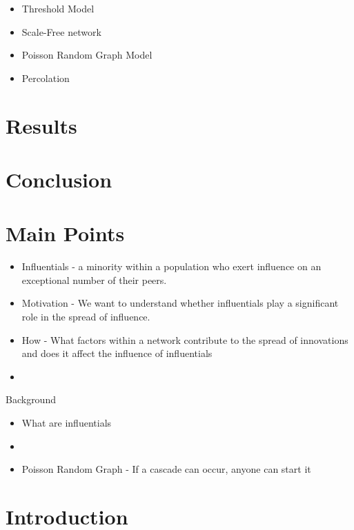\documentclass[10pt, oneside, reqno]{amsart}
\theoremstyle{plain}%
\theoremstyle{definition}
\theoremstyle{remark}
\begin{document}
\begin{itemize}
    \item Threshold Model
    \item Scale-Free network
    \item Poisson Random Graph Model 
    \item Percolation
\end{itemize}


\section{Results}




\section{Conclusion}







\section{Main Points}

\begin{itemize}
    \item Influentials - a minority within a population who exert influence on an exceptional number of their peers.
    \item Motivation - We want to understand whether influentials play a significant role in the spread of influence.
    \item How - What factors within a network contribute to the spread of innovations and does it affect the influence of influentials
    \item 
\end{itemize}


Background 
\begin{itemize}
    \item What are influentials 
    \item 
\end{itemize}

\begin{itemize}
    \item Poisson Random Graph - If a cascade can occur, anyone can start it
\end{itemize}

\section{Introduction}
\end{document}
